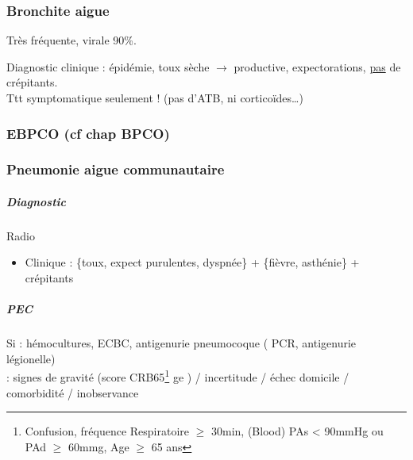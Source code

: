 \documentclass[11pt]{article}
\begin{document}
\subsubsection{Bronchite aigue}
\label{sec:orgd0b336b}
Très fréquente, virale 90\%. 

Diagnostic clinique : épidémie, toux sèche \(\to\) productive, expectorations,
\uline{pas} de crépitants.\\

Ttt symptomatique seulement ! (pas d'ATB, ni corticoïdes\ldots{})

\subsubsection{EBPCO (cf chap BPCO)}
\label{sec:org03ad58d}

\subsubsection{Pneumonie aigue communautaire}
\label{sec:orgee3cb45}

\subparagraph{Diagnostic}
\label{sec:org15db993}
Radio
\begin{itemize}
\item Clinique : \{toux, expect purulentes, dyspnée\} + \{fièvre, asthénie\} + crépitants
\end{itemize}

\subparagraph{PEC}
\label{sec:org07f5256}
Si \faHospitalO : hémocultures, ECBC, antigenurie pneumocoque (\textpm{} PCR,
antigenurie légionelle)\\
\faHospitalO : signes de gravité (score CRB65\footnote{Confusion, fréquence Respiratoire \(\ge\) 30min, (Blood) PAs < 90mmHg ou PAd \(\ge\) 60mmg, Age \(\ge\) 65 ans} ge  ) / incertitude / échec domicile / comorbidité / inobservance
\end{document}
